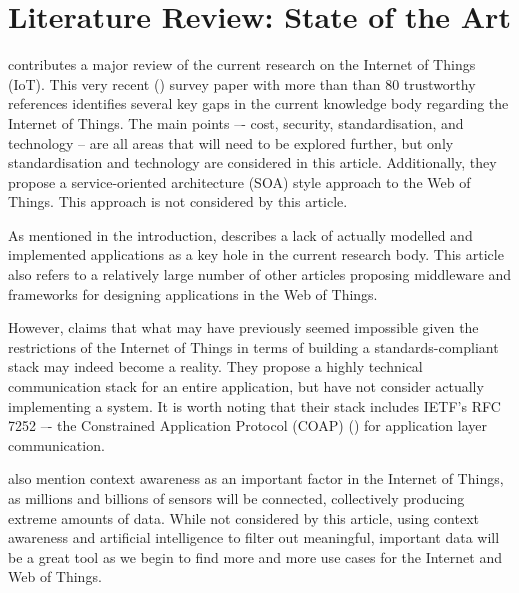 \section{Literature Review: State of the Art}

\textcite{xu-he-li:internet-of-things-in-industries-a-survey:2014} contributes a major review of the current research on the Internet of Things (IoT). This very recent (\citeyear{xu-he-li:internet-of-things-in-industries-a-survey:2014}) survey paper with more than than 80 trustworthy references identifies several key gaps in the current knowledge body regarding the Internet of Things. The main points –- cost, security, standardisation, and technology -- are all areas that will need to be explored further, but only standardisation and technology are considered in this article. Additionally, they propose a service-oriented architecture (SOA) style approach to the Web of Things. This approach is not considered by this article.

As mentioned in the introduction, \textcite{paganelli-turchi-guili:a-web-of-things-framework-for-restful-applications-and-its-experimentation-in-a-smart-city:2014} describes a lack of actually modelled and implemented applications as a key hole in the current research body. This article also refers to a relatively large number of other articles proposing middleware and frameworks for designing applications in the Web of Things.

However, \textcite{palattella-accettura-vilajosana-watteyne-gieco-boggia-dohler:standardized-protocol-stack-for-the-internet-of-important-things:2012} claims that what may have previously seemed impossible given the restrictions of the Internet of Things in terms of building a standards-compliant stack may indeed become a reality. They propose a highly technical communication stack for an entire application, but have not consider actually implementing a system. It is worth noting that their stack includes IETF's RFC 7252 –- the Constrained Application Protocol (COAP) (\citeyear{ietf:the-constrained-application-protocol:2014}) for application layer communication.

\textcite{xu-he-li:internet-of-things-in-industries-a-survey:2014} also mention context awareness as an important factor in the Internet of Things, as millions and billions of sensors will be connected, collectively producing extreme amounts of data. While not considered by this article, using context awareness and artificial intelligence to filter out meaningful, important data will be a great tool as we begin to find more and more use cases for the Internet and Web of Things.

